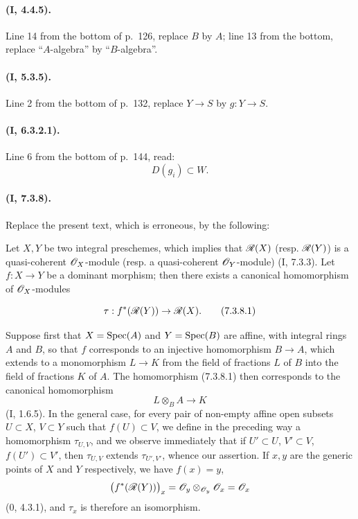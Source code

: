 \paragraph{(I, 4.4.5).}
Line 14 from the bottom of p.~126, replace $B$ by $A$; line 13 from the
bottom, replace ``$A$-algebra'' by ``$B$-algebra''.

\paragraph{(I, 5.3.5).}
Line 2 from the bottom of p.~132, replace $Y\to S$ by $g:Y\to S$.

\paragraph{(I, 6.3.2.1).}
Line 6 from the bottom of p.~144, read:
\[
  D(g_i)\subset W.
\]

\paragraph{(I, 7.3.8).}
Replace the present text, which is erroneous, by the following:

Let $X,Y$ be two integral preschemes, which implies that
$\mathscr{R}(X)$ (resp. $\mathscr{R}(Y)$) is a quasi-coherent $\mathscr{O}_X$-module
(resp. a quasi-coherent $\mathscr{O}_Y$-module) (I, 7.3.3). Let $f:X\to Y$ be a
dominant morphism; then there exists a canonical homomorphism of
$\mathscr{O}_X$-modules
\begin{equation}
\label{ega2:addendum:I.7.3.8.1}
  \tau:f^*(\mathscr{R}(Y))\to\mathscr{R}(X).
\tag{7.3.8.1}
\end{equation}

Suppose first that $X=\operatorname{Spec}(A)$ and $Y=\operatorname{Spec}(B)$ are affine, with
integral rings $A$ and $B$, so that $f$ corresponds to an injective
homomorphism $B\to A$, which extends to a monomorphism $L\to K$ from the
field of fractions $L$ of $B$ into the field of fractions $K$ of $A$.
The homomorphism (7.3.8.1) then corresponds to the canonical homomorphism
\[
  L\otimes_B A\to K
\]
(I, 1.6.5). In the general case, for every pair of non-empty affine open
subsets $U\subset X$, $V\subset Y$ such that $f(U)\subset V$, we define
in the preceding way a homomorphism $\tau_{U,V}$, and we observe
immediately that if $U'\subset U$, $V'\subset V$,
$f(U')\subset V'$, then $\tau_{U,V}$ extends $\tau_{U',V'}$, whence our
assertion. If $x,y$ are the generic points of $X$ and $Y$
respectively, we have $f(x)=y$,
\[
  \bigl(f^*(\mathscr{R}(Y))\bigr)_x
  =\mathscr{O}_y\otimes_{\mathscr{O}_y}\mathscr{O}_x
  =\mathscr{O}_x
\]
(0, 4.3.1), and $\tau_x$ is therefore an isomorphism.

